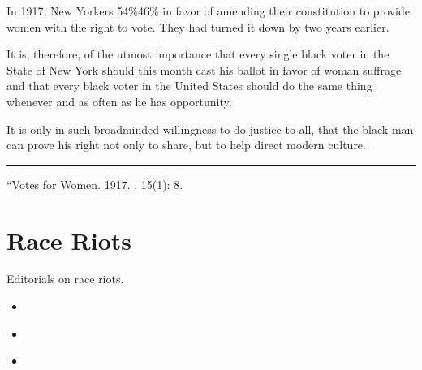 \documentclass[letterpaper,10pt,english]{jupyterBook}
\begin{document}
\begin{sphinxShadowBox}
\sphinxstylesidebartitle{}

\sphinxAtStartPar
In 1917, New Yorkers  54\%\sphinxhyphen{}46\% in favor of amending their constitution to provide women with the right to vote. They had turned it down by  two years earlier.
\end{sphinxShadowBox}

\sphinxAtStartPar
It is, therefore, of the utmost importance that every single black voter in the State of New York should this month cast his ballot in favor of woman suffrage and that every black voter in the United States should do the same thing whenever and as often as he has opportunity.

\sphinxAtStartPar
It is only in such broad\sphinxhyphen{}minded willingness to do justice to all, that the black man can prove his right not only to share, but to help direct modern culture.


\bigskip\hrule\bigskip


\sphinxAtStartPar
{} “Votes for Women. 1917. . 15(1): 8.


\chapter{Race Riots}
\label{\detokenize{Sections/race_riots:race-riots}}\label{\detokenize{Sections/race_riots::doc}}
\sphinxAtStartPar
Editorials on race riots.
\begin{itemize}
\item {} 
\sphinxAtStartPar
{\hyperref[\detokenize{Volumes/18/06/shillady_and_texas::doc}]{}}

\item {} 
\sphinxAtStartPar
{\hyperref[\detokenize{Volumes/34/06/mob_tactics::doc}]{}}

\item {} 
\sphinxAtStartPar
{\hyperref[\detokenize{Volumes/19/03/brothers_come_north::doc}]{}}

\end{itemize}
\end{document}
